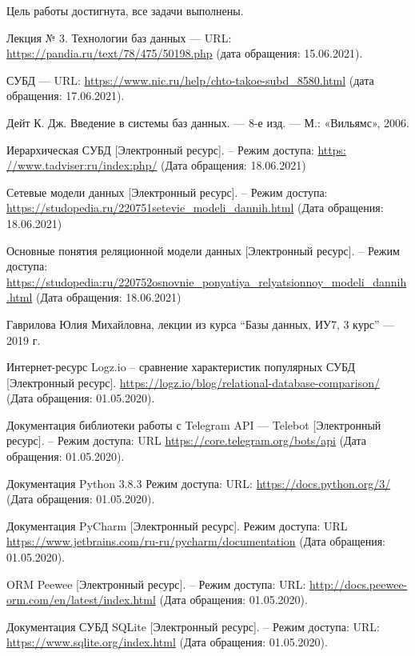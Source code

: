 \documentclass[12pt,a4paper,oneside]{report}
\begin{document}
Цель работы достигнута, все задачи выполнены.



\renewcommand{\bibname}{Список использованной литературы}
\begin{thebibliography}{2}

 Лекция № 3. Технологии баз данных — URL: \url{https://pandia.ru/text/78/475/50198.php}
(дата обращения: 15.06.2021).

 СУБД — URL:
\url{https://www.nic.ru/help/chto-takoe-subd\_8580.html}
(дата обращения: 17.06.2021).

 Дейт К. Дж. Введение в системы баз данных. — 8-е изд. — М.: «Вильямс», 2006.

 Иерархическая СУБД [Электронный ресурс]. – Режим доступа:
\url{https: //www.tadviser:ru/index:php/}
(Дата обращения: 18.06.2021)

 Сетевые модели данных [Электронный ресурс]. – Режим доступа: \url{https://studopedia.ru/220751setevie\_modeli\_dannih.html}
(Дата обращения: 18.06.2021)

 Основные понятия реляционной модели данных [Электронный ресурс]. – Режим доступа: \url{https://studopedia:ru/220752osnovnie\_ponyatiya\_relyatsionnoy\_modeli\_dannih.html}
(Дата обращения: 18.06.2021)

 Гаврилова Юлия Михайловна, лекции из курса “Базы данных, ИУ7, 3 курс” — 2019 г.

 Интернет-ресурс Logz.io – сравнение характеристик популярных СУБД [Электронный ресурс]. 
\url{https://logz.io/blog/relational-database-comparison/}
(Дата обращения: 01.05.2020).

 Документация библиотеки работы с  Telegram API — Telebot [Электронный ресурс]. – Режим доступа: URL
\url{https://core.telegram.org/bots/api}
(Дата обращения: 01.05.2020).

 Документация Python 3.8.3 Режим доступа: URL:  
\url{https://docs.python.org/3/}
(Дата обращения: 01.05.2020).

 Документация PyCharm [Электронный ресурс]. Режим доступа: URL 
\url{https://www.jetbrains.com/ru-ru/pycharm/documentation}
(Дата обращения: 01.05.2020).

 ORM Peewee [Электронный ресурс]. – Режим доступа: URL: 
\url{http://docs.peewee-orm.com/en/latest/index.html}
(Дата обращения: 01.05.2020).

 Документация СУБД SQLite [Электронный ресурс]. – Режим доступа: URL: 
\url{https://www.sqlite.org/index.html}
(Дата обращения: 01.05.2020).



\end{thebibliography}
\end{document}
